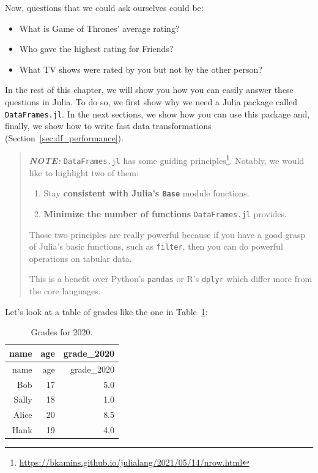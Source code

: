 \documentclass[
  notoc %
]{tufte-book}
\DeclareRobustCommand{\href}[2]{#2\footnote{\url{#1}}}
\providecommand{\tightlist}{%
  \setlength{\itemsep}{0pt}\setlength{\parskip}{0pt}
}
\newcommand{\passthrough}[1]{#1}
\begin{document}
Now, questions that we could ask ourselves could be:

\begin{itemize}
\tightlist
\item
  What is Game of Thrones' average rating?
\item
  Who gave the highest rating for Friends?
\item
  What TV shows were rated by you but not by the other person?
\end{itemize}

In the rest of this chapter, we will show you how you can easily answer
these questions in Julia. To do so, we first show why we need a Julia
package called \passthrough{\lstinline!DataFrames.jl!}. In the next
sections, we show how you can use this package and, finally, we show how
to write fast data transformations (Section~\ref{sec:df_performance}).

\begin{quote}
\textbf{\emph{NOTE:}} \passthrough{\lstinline!DataFrames.jl!} has some
\href{https://bkamins.github.io/julialang/2021/05/14/nrow.html}{guiding
principles}. Notably, we would like to highlight two of them:

\begin{enumerate}
\def\labelenumi{\arabic{enumi}.}
\tightlist
\item
  Stay \textbf{consistent with Julia's \passthrough{\lstinline!Base!}}
  module functions.
\item
  \textbf{Minimize the number of functions}
  \passthrough{\lstinline!DataFrames.jl!} provides.
\end{enumerate}

Those two principles are really powerful because if you have a good
grasp of Julia's basic functions, such as
\passthrough{\lstinline!filter!}, then you can do powerful operations on
tabular data.

This is a benefit over Python's \passthrough{\lstinline!pandas!} or R's
\passthrough{\lstinline!dplyr!} which differ more from the core
languages.
\end{quote}

Let's look at a table of grades like the one in
Table~\ref{tbl:grades_for_2020}:

\hypertarget{tbl:grades_for_2020}{}
\begin{longtable}[]{@{}rrr@{}}
\caption{\label{tbl:grades_for_2020}Grades for 2020.}\tabularnewline
\toprule
name & age & grade\_2020 \\
\midrule
\endfirsthead
\toprule
name & age & grade\_2020 \\
\midrule
\endhead
Bob & 17 & 5.0 \\
Sally & 18 & 1.0 \\
Alice & 20 & 8.5 \\
Hank & 19 & 4.0 \\
\bottomrule
\end{longtable}
\end{document}
